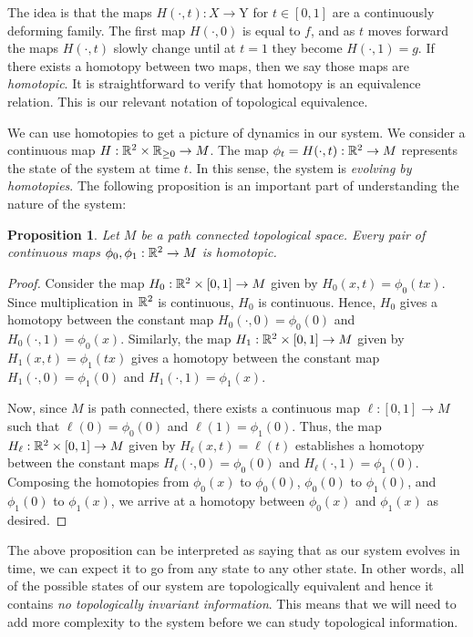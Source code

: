 \documentclass{article}
\newtheorem{proposition}{Proposition}[section]
\theoremstyle{definition}
\numberwithin{figure}{section}
\begin{document}
The idea is that the maps $H(\cdot,t):X\to $Y for $t\in [0,1]$ are a continuously deforming family. The first map $H(\cdot, 0)$ is equal to $f$, and as $t$ moves forward the maps $H(\cdot,t)$ slowly change until at $t=1$ they become $H(\cdot,1)=g$. If there exists a homotopy between two maps, then we say those maps are \textit{homotopic}. It is straightforward to verify that homotopy is an equivalence relation. This is our relevant notation of topological equivalence.

We can use homotopies to get a picture of dynamics in our system. We consider a continuous map $H: \mathbb{R}^2 \times \mathbb{R}_{\geq 0}\to M$. The map $\phi_t=H(\cdot,t): \mathbb{R}^2\to M$ represents the state of the system at time $t$. In this sense, the system is \textit{evolving by homotopies}. The following proposition is an important part of understanding the nature of the system:

\begin{proposition}
Let $M$ be a path connected topological space. Every pair of continuous maps $\phi_0,\phi_1:\mathbb{R}^2\to M$ is homotopic.
\end{proposition}
\begin{proof}
Consider the map $H_0: \mathbb{R}^2\times [0,1]\to M$ given by $H_0(x,t)=\phi_0(tx)$. Since multiplication in $\mathbb{R}^2$ is continuous, $H_0$ is continuous. Hence, $H_0$ gives a homotopy between the constant map $H_0(\cdot,0)=\phi_0(0)$ and $H_0(\cdot,1)=\phi_0(x)$. Similarly, the map $H_1:\mathbb{R}^2\times [0,1]\to M$  given by $H_1(x,t)=\phi_1(tx)$ gives a homotopy between the constant map $H_1(\cdot,0)=\phi_1(0)$ and $H_1(\cdot,1)=\phi_1(x)$.

Now, since $M$ is path connected, there exists a continuous map $\ell: [0,1]\to M$ such that $\ell(0)=\phi_0(0)$ and $\ell(1)=\phi_1(0)$. Thus, the map $H_\ell:\mathbb{R}^2\times [0,1]\to M$ given by $H_\ell(x,t)=\ell(t)$ establishes a homotopy between the constant maps $H_\ell(\cdot,0)=\phi_0(0)$ and $H_\ell(\cdot,1)=\phi_1(0)$. Composing the homotopies from $\phi_0(x)$ to $\phi_0(0)$, $\phi_0(0)$ to $\phi_1(0)$, and $\phi_1(0)$ to $\phi_1(x)$, we arrive at a homotopy between $\phi_0(x)$ and $\phi_1(x)$ as desired.
\end{proof}

The above proposition can be interpreted as saying that as our system evolves in time, we can expect it to go from any state to any other state. In other words, all of the possible states of our system are topologically equivalent and hence it contains \textit{no topologically invariant information}. This means that we will need to add more complexity to the system before we can study topological information.
\end{document}
